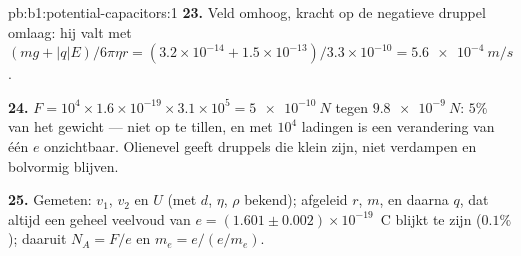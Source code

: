 \begin{solution}{pb:b1:potential-capacitors:1}
\textbf{23.} Veld omhoog, kracht op de negatieve druppel omlaag: hij valt met $(mg
+ |q|E)/6\pi\eta r = (3.2 \times 10^{-14} + 1.5 \times 10^{-13})/3.3 \times 10^{-10} =
\qty{5.6e-4}{m/s}$.

\textbf{24.} $F = 10^4 \times 1.6 \times 10^{-19} \times 3.1 \times 10^5 = \qty{5e-10}{N}$
tegen $\qty{9.8e-9}{N}$: $5\%$ van het gewicht --- niet op te tillen, en met
$10^4$ ladingen is een verandering van één $e$ onzichtbaar. Olienevel geeft druppels
die klein zijn, niet verdampen en bolvormig blijven.

\textbf{25.} Gemeten: $v_1$, $v_2$ en $U$ (met $d$, $\eta$, $\rho$ bekend);
afgeleid $r$, $m$, en daarna $q$, dat altijd een geheel veelvoud van
$e = (1.601 \pm 0.002) \times 10^{-19}$~C blijkt te zijn ($0.1\%$); daaruit $N_A = F/e$ en
$m_e = e/(e/m_e)$.
\end{solution}

